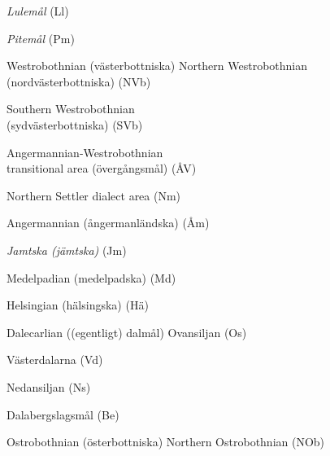 \item 

\textit{Lulemål} (Ll)

\item 

\textit{Pitemål} (Pm)


\item 

Westrobothnian (västerbottniska)  Northern Westrobothnian (nordvästerbottniska) (NVb)

\item 

Southern Westrobothnian\\
(sydvästerbottniska) (SVb)

\item 

Angermannian-Westrobothnian\\
transitional area (övergångsmål) (ÅV)


Northern Settler dialect area (Nm)  

Angermannian (ångermanländska) (Åm)  

\textit{Jamtska (jämtska)} (Jm)  

Medelpadian (medelpadska) (Md)  

Helsingian (hälsingska) (Hä)  

\item 

Dalecarlian ((egentligt) dalmål)  Ovansiljan (Os)

\item 

Västerdalarna (Vd)

\item 

Nedansiljan (Ns)


Dalabergslagsmål (Be)  

\item 

Ostrobothnian (österbottniska)  Northern Ostrobothnian (NOb)

\item 

